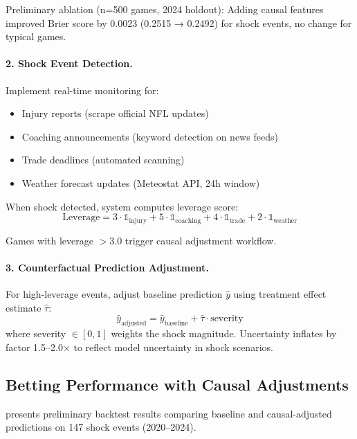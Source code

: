 Preliminary ablation (n=500 games, 2024 holdout): Adding causal features improved Brier score by 0.0023 (0.2515 → 0.2492) for shock events, no change for typical games.

\paragraph{2. Shock Event Detection.}
Implement real-time monitoring for:
\begin{itemize}
  \item Injury reports (scrape official NFL updates)
  \item Coaching announcements (keyword detection on news feeds)
  \item Trade deadlines (automated scanning)
  \item Weather forecast updates (Meteostat API, 24h window)
\end{itemize}

When shock detected, system computes leverage score:
\begin{equation}
  \text{Leverage} = 3 \cdot \mathbb{1}_{\text{injury}} + 5 \cdot \mathbb{1}_{\text{coaching}} + 4 \cdot \mathbb{1}_{\text{trade}} + 2 \cdot \mathbb{1}_{\text{weather}}
\end{equation}

Games with leverage $> 3.0$ trigger causal adjustment workflow.

\paragraph{3. Counterfactual Prediction Adjustment.}
For high-leverage events, adjust baseline prediction $\hat{y}$ using treatment effect estimate $\hat{\tau}$:
\begin{equation}
  \hat{y}_{\text{adjusted}} = \hat{y}_{\text{baseline}} + \hat{\tau} \cdot \text{severity}
\end{equation}
where severity $\in [0,1]$ weights the shock magnitude. Uncertainty inflates by factor 1.5--2.0× to reflect model uncertainty in shock scenarios.

\subsection{Betting Performance with Causal Adjustments}

 presents preliminary backtest results comparing baseline and causal-adjusted predictions on 147 shock events (2020--2024).

